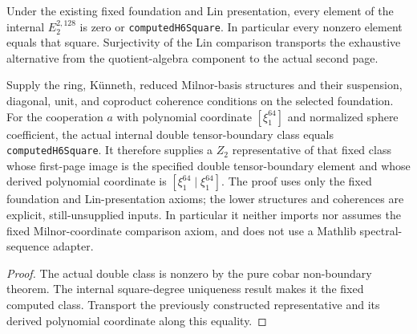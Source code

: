 \begin{proposition}
  \label{prop:h6-internal-square-unique}
  \notready
  Under the existing fixed foundation and Lin presentation, every element
  of the internal $E_2^{2,128}$ is zero or \texttt{computedH6Square}.
  In particular every nonzero element equals that square. Surjectivity of
  the Lin comparison transports the exhaustive alternative from the
  quotient-algebra component to the actual second page.
\end{proposition}

\begin{proposition}
  \label{prop:h6-computed-double-representative}
  \notready
  Supply the ring, K\"unneth, reduced Milnor-basis structures and their
  suspension, diagonal, unit, and coproduct coherence conditions on the
  selected foundation. For the cooperation $a$ with polynomial coordinate
  $[\xi_1^{64}]$ and normalized sphere coefficient, the actual internal
  double tensor-boundary class equals \texttt{computedH6Square}.
  It therefore supplies a $Z_2$ representative of that fixed class whose
  first-page image is the specified double tensor-boundary element and
  whose derived polynomial coordinate is $[\xi_1^{64}\mid\xi_1^{64}]$.
  The proof uses only the fixed foundation and Lin-presentation axioms;
  the lower structures and coherences are explicit, still-unsupplied inputs.
  In particular it neither imports nor assumes the fixed Milnor-coordinate
  comparison axiom, and does not use a Mathlib spectral-sequence adapter.
\end{proposition}
\begin{proof}
  The actual double class is nonzero by the pure cobar non-boundary theorem.
  The internal square-degree uniqueness result makes it the fixed computed
  class. Transport the previously constructed representative and its
  derived polynomial coordinate along this equality.
\end{proof}

